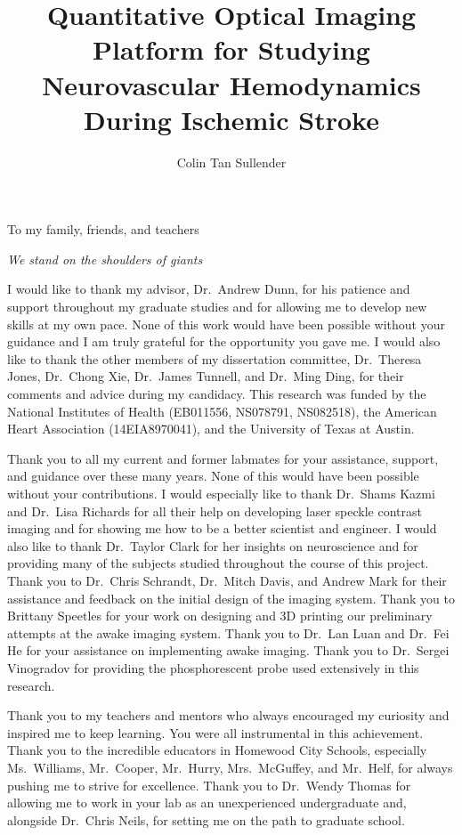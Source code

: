 \documentclass[12pt]{report}
\author{Colin Tan Sullender}
\title{Quantitative Optical Imaging Platform for Studying Neurovascular Hemodynamics During Ischemic Stroke}
\begin{document}
\copyrightpage      %
\commcertpage       %
\titlepage          %


\begin{dedication}
To my family, friends, and teachers

\textit{We stand on the shoulders of giants}

\end{dedication}


\begin{acknowledgments}
I would like to thank my advisor, Dr.\ Andrew Dunn, for his patience and support throughout my graduate studies and for allowing me to develop new skills at my own pace. None of this work would have been possible without your guidance and I am truly grateful for the opportunity you gave me. I would also like to thank the other members of my dissertation committee, Dr.\ Theresa Jones, Dr.\ Chong Xie, Dr.\ James Tunnell, and Dr.\ Ming Ding, for their comments and advice during my candidacy. This research was funded by the National Institutes of Health (EB011556, NS078791, NS082518), the American Heart Association (14EIA8970041), and the University of Texas at Austin.

Thank you to all my current and former labmates for your assistance, support, and guidance over these many years. None of this would have been possible without your contributions. I would especially like to thank Dr.\ Shams Kazmi and Dr.\ Lisa Richards for all their help on developing laser speckle contrast imaging and for showing me how to be a better scientist and engineer. I would also like to thank Dr.\ Taylor Clark for her insights on neuroscience and for providing many of the subjects studied throughout the course of this project. Thank you to Dr.\ Chris Schrandt, Dr.\ Mitch Davis, and Andrew Mark for their assistance and feedback on the initial design of the imaging system. Thank you to Brittany Speetles for your work on designing and 3D printing our preliminary attempts at the awake imaging system. Thank you to Dr.\ Lan Luan and Dr.\ Fei He for your assistance on implementing awake imaging. Thank you to Dr.\ Sergei Vinogradov for providing the phosphorescent probe used extensively in this research.

Thank you to my teachers and mentors who always encouraged my curiosity and inspired me to keep learning. You were all instrumental in this achievement. Thank you to the incredible educators in Homewood City Schools, especially Ms.\ Williams, Mr.\ Cooper, Mr.\ Hurry, Mrs.\ McGuffey, and Mr.\ Helf, for always pushing me to strive for excellence. Thank you to Dr.\ Wendy Thomas for allowing me to work in your lab as an unexperienced undergraduate and, alongside Dr.\ Chris Neils, for setting me on the path to graduate school.


\end{acknowledgments}
\end{document}
